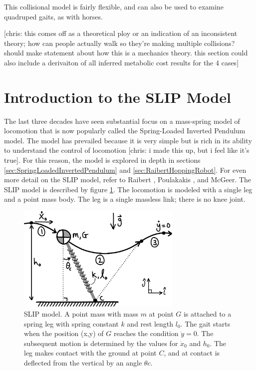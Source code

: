 This collisional model is fairly flexible, and can also be used to examine quadruped gaits, as with horses.

[chris: this comes off as a theoretical ploy or an indication of an inconsistent theory; how can people actually walk so they're making multiple collisions? should make statement about how this is a mechanics theory. this section could also include a derivaiton of all inferred metabolic cost results for the 4 cases]

\section{Introduction to the SLIP Model} %
\label{sec:SLIP}

The last three decades have seen substantial focus on a mass-spring model of locomotion that is now popularly called the Spring-Loaded Inverted Pendulum model. The model has prevailed because it is very simple but is rich in its ability to understand the control of locomotion [chris: i made this up, but i feel like it's true]. For this reason, the model is explored in depth in sections \ref{sec:SpringLoadedInvertedPendulum} and \ref{sec:RaibertHoppingRobot}. For even more detail on the SLIP model, refer to Raibert \cite{raibert95}, Poulakakis \cite{poulakakis07,poulakakis07b}, and McGeer. The SLIP model is described by figure \ref{fig:SLIPSetup}. The locomotion is modeled with a single leg and a point mass body. The leg is a single massless link; there is no knee joint.

\begin{figure}[h]		%
\begin{centering}
\includegraphics[width=0.7\textwidth]{Figures/SLIPSetup}\par
\end{centering}
\caption[Diagram: SLIP Model]{SLIP model. A point mass with mass $m$ at point $G$ is attached to a spring leg with spring constant $k$ and rest length $l_{0}$.  The gait starts when the position (x,y) of $G$  reaches the condition $\dot{y} = 0$. The subsequent motion is determined by the values for $\dot{x}_{0}$ and $h_{0}$. The leg makes contact with the ground at point $C$, and at contact is deflected from the vertical by an angle $\theta{c}$.}
\label{fig:SLIPSetup}
\end{figure}
%

